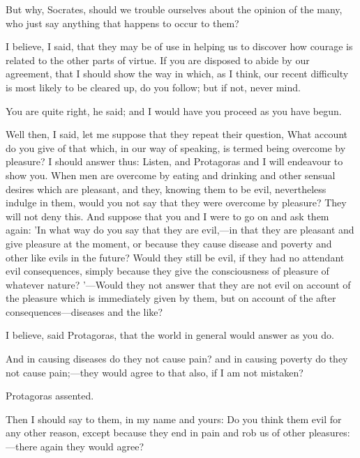 \documentclass[11pt,letter]{article}
\begin{document}
\par  But why, Socrates, should we trouble ourselves about the opinion of the many, who just say anything that happens to occur to them?

\par  I believe, I said, that they may be of use in helping us to discover how courage is related to the other parts of virtue. If you are disposed to abide by our agreement, that I should show the way in which, as I think, our recent difficulty is most likely to be cleared up, do you follow; but if not, never mind.

\par  You are quite right, he said; and I would have you proceed as you have begun.

\par  Well then, I said, let me suppose that they repeat their question, What account do you give of that which, in our way of speaking, is termed being overcome by pleasure? I should answer thus: Listen, and Protagoras and I will endeavour to show you. When men are overcome by eating and drinking and other sensual desires which are pleasant, and they, knowing them to be evil, nevertheless indulge in them, would you not say that they were overcome by pleasure? They will not deny this. And suppose that you and I were to go on and ask them again: 'In what way do you say that they are evil,—in that they are pleasant and give pleasure at the moment, or because they cause disease and poverty and other like evils in the future? Would they still be evil, if they had no attendant evil consequences, simply because they give the consciousness of pleasure of whatever nature? '—Would they not answer that they are not evil on account of the pleasure which is immediately given by them, but on account of the after consequences—diseases and the like?

\par  I believe, said Protagoras, that the world in general would answer as you do.

\par  And in causing diseases do they not cause pain? and in causing poverty do they not cause pain;—they would agree to that also, if I am not mistaken?

\par  Protagoras assented.

\par  Then I should say to them, in my name and yours: Do you think them evil for any other reason, except because they end in pain and rob us of other pleasures:—there again they would agree?
\end{document}

